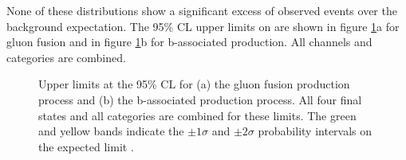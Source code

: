 None of these distributions show a significant excess of observed events over the background
expectation. The
95\% \ac{CL} upper limits on \xsbr are shown in figure \ref{fig:mssm_results_limits}a
for gluon fusion and in figure \ref{fig:mssm_results_limits}b for b-associated
production. All channels and categories are combined. 
\begin{figure}[h!]
\begin{center}
\end{center}
\caption[Upper limits at the 95\% CL for the gluon fusion production process and the
b-associated production process, combining all final states and categories.]{Upper limits at the 95\% CL for (a) the gluon fusion production
process and (b) the b-associated production process. All four final states and 
all categories are combined for these limits. The green and yellow bands indicate
the $\pm 1\sigma$ and $\pm 2\sigma$ probability intervals on the expected limit \cite{CMS-PAS-HIG-16-037}.}
\label{fig:mssm_results_limits}
\end{figure}

